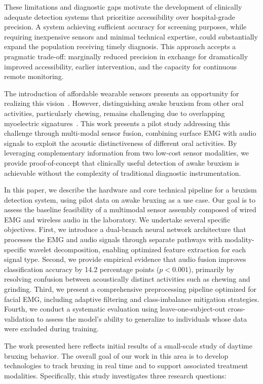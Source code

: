 \documentclass[pdflatex,sn-nature,iicol]{sn-jnl}
\begin{document}
These limitations and diagnostic gaps motivate the development of clinically adequate detection systems that prioritize accessibility over hospital-grade precision. A system achieving sufficient accuracy for screening purposes, while requiring inexpensive sensors and minimal technical expertise, could substantially expand the population receiving timely diagnosis. This approach accepts a pragmatic trade-off: marginally reduced precision in exchange for dramatically improved accessibility, earlier intervention, and the capacity for continuous remote monitoring.

The introduction of affordable wearable sensors presents an opportunity for realizing this vision~\cite{gul2024advanced}. However, distinguishing awake bruxism from other oral activities, particularly chewing, remains challenging due to overlapping myoelectric signatures~\cite{stuginski2016detection}. This work presents a pilot study addressing this challenge through multi-modal sensor fusion, combining surface EMG with audio signals to exploit the acoustic distinctiveness of different oral activities. By leveraging complementary information from two low-cost sensor modalities, we provide proof-of-concept that clinically useful detection of awake bruxism is achievable without the complexity of traditional diagnostic instrumentation.

In this paper, we describe the hardware and core technical pipeline for a bruxism detection system, using pilot data on awake bruxing as a use case. Our goal is to assess the baseline feasibility of a multimodal sensor assembly composed of wired EMG and wireless audio in the laboratory. We undertake several specific objectives. First, we introduce a dual-branch neural network architecture that processes the EMG and audio signals through separate pathways with modality-specific wavelet decomposition, enabling optimized feature extraction for each signal type. Second, we provide empirical evidence that audio fusion improves classification accuracy by 14.2 percentage points ($p < 0.001$), primarily by resolving confusion between acoustically distinct activities such as chewing and grinding. Third, we present a comprehensive preprocessing pipeline optimized for facial EMG, including adaptive filtering and class-imbalance mitigation strategies. Fourth, we conduct a systematic evaluation using leave-one-subject-out cross-validation to assess the model's ability to generalize to individuals whose data were excluded during training.

The work presented here reflects initial results of a small-scale study of daytime bruxing behavior. The overall goal of our work in this area is to develop technologies to track bruxing in real time and to support associated treatment modalities. Specifically, this study investigates three research questions:
\end{document}
